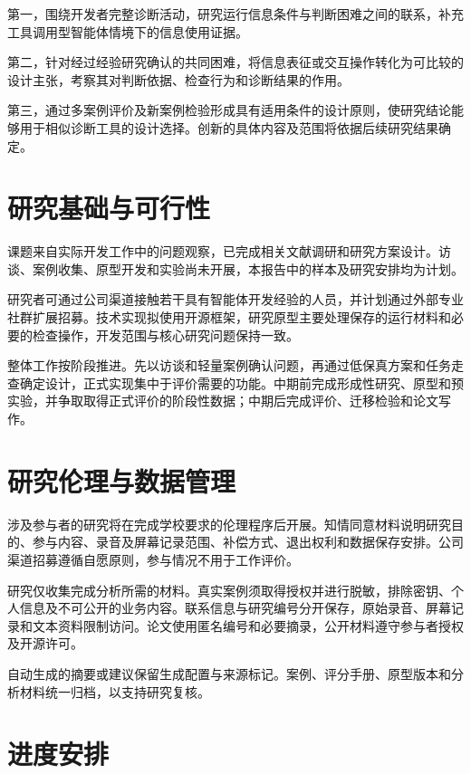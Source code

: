 第一，围绕开发者完整诊断活动，研究运行信息条件与判断困难之间的联系，补充工具调用型智能体情境下的信息使用证据。

第二，针对经过经验研究确认的共同困难，将信息表征或交互操作转化为可比较的设计主张，考察其对判断依据、检查行为和诊断结果的作用。

第三，通过多案例评价及新案例检验形成具有适用条件的设计原则，使研究结论能够用于相似诊断工具的设计选择。创新的具体内容及范围将依据后续研究结果确定。

\section{研究基础与可行性}

课题来自实际开发工作中的问题观察，已完成相关文献调研和研究方案设计。访谈、案例收集、原型开发和实验尚未开展，本报告中的样本及研究安排均为计划。

研究者可通过公司渠道接触若干具有智能体开发经验的人员，并计划通过外部专业社群扩展招募。技术实现拟使用开源框架，研究原型主要处理保存的运行材料和必要的检查操作，开发范围与核心研究问题保持一致。

整体工作按阶段推进。先以访谈和轻量案例确认问题，再通过低保真方案和任务走查确定设计，正式实现集中于评价需要的功能。中期前完成形成性研究、原型和预实验，并争取取得正式评价的阶段性数据；中期后完成评价、迁移检验和论文写作。

\section{研究伦理与数据管理}

涉及参与者的研究将在完成学校要求的伦理程序后开展。知情同意材料说明研究目的、参与内容、录音及屏幕记录范围、补偿方式、退出权利和数据保存安排。公司渠道招募遵循自愿原则，参与情况不用于工作评价。

研究仅收集完成分析所需的材料。真实案例须取得授权并进行脱敏，排除密钥、个人信息及不可公开的业务内容。联系信息与研究编号分开保存，原始录音、屏幕记录和文本资料限制访问。论文使用匿名编号和必要摘录，公开材料遵守参与者授权及开源许可。

自动生成的摘要或建议保留生成配置与来源标记。案例、评分手册、原型版本和分析材料统一归档，以支持研究复核。

\section{进度安排}

